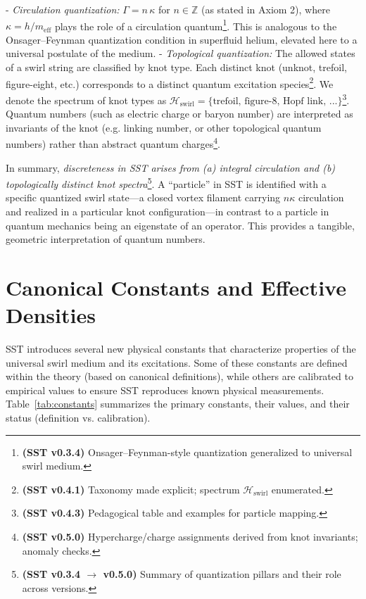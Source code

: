 \documentclass[reprint,aps,onecolumn,nofootinbib]{revtex4-2}
\begin{document}
        - \emph{Circulation quantization:} $\Gamma = n\,\kappa$ for $n\in\mathbb{Z}$ (as stated in Axiom 2), where $\kappa = h/m_{\text{eff}}$ plays the role of a circulation quantum\footnote{\textbf{(SST v0.3.4)} Onsager–Feynman-style quantization generalized to universal swirl medium.}. This is analogous to the Onsager–Feynman quantization condition in superfluid helium, elevated here to a universal postulate of the medium.
        - \emph{Topological quantization:} The allowed states of a swirl string are classified by knot type. Each distinct knot (unknot, trefoil, figure-eight, etc.) corresponds to a distinct quantum excitation species\footnote{\textbf{(SST v0.4.1)} Taxonomy made explicit; spectrum $\mathcal{H}_{\text{swirl}}$ enumerated.}. We denote the spectrum of knot types as $\mathcal{H}_{\text{swirl}} = \{\text{trefoil, figure-8, Hopf link, ...}\}$\footnote{\textbf{(SST v0.4.3)} Pedagogical table and examples for particle mapping.}. Quantum numbers (such as electric charge or baryon number) are interpreted as invariants of the knot (e.g. linking number, or other topological quantum numbers) rather than abstract quantum charges\footnote{\textbf{(SST v0.5.0)} Hypercharge/charge assignments derived from knot invariants; anomaly checks.}.

        In summary, \emph{discreteness in SST arises from (a) integral circulation and (b) topologically distinct knot spectra}\footnote{\textbf{(SST v0.3.4 $\rightarrow$ v0.5.0)} Summary of quantization pillars and their role across versions.}. A “particle” in SST is identified with a specific quantized swirl state—a closed vortex filament carrying $n\kappa$ circulation and realized in a particular knot configuration—in contrast to a particle in quantum mechanics being an eigenstate of an operator. This provides a tangible, geometric interpretation of quantum numbers.


\section{Canonical Constants and Effective Densities}
    SST introduces several new physical constants that characterize properties of the universal swirl medium and its excitations. Some of these constants are defined within the theory (based on canonical definitions), while others are calibrated to empirical values to ensure SST reproduces known physical measurements. Table~\ref{tab:constants} summarizes the primary constants, their values, and their status (definition vs. calibration).
\end{document}
